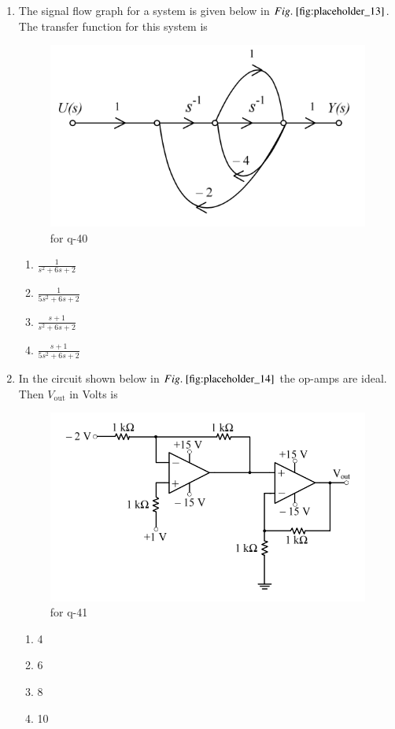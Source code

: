 \documentclass[journal,12pt,onecolumn]{IEEEtran}
\theoremstyle{remark}
\begin{document}
\begin{enumerate}
\item The signal flow graph for a system is given below in $\figref{fig:placeholder_13}$. The transfer function  for this system is
\begin{figure}[H]
    \centering
    \includegraphics[width=0.5\columnwidth]{figs/fig_13.png}
    \caption{for q-40}
    \label{fig:placeholder_13}
\end{figure}

\begin{multicols}{2}

\begin{enumerate}
\item $\frac{1}{s^2 + 6s + 2}$
\item  $\frac{1}{5s^2 + 6s + 2}$ 
\item  $\frac{s + 1}{s^2 + 6s + 2}$
\item  $\frac{s + 1}{5s^2 + 6s + 2}$ 
\end{enumerate}
\end{multicols}
\hfill {}

\item In the circuit shown below in $\figref{fig:placeholder_14}$ the op-amps are ideal. Then $V_{\text{out}}$ in Volts is
\begin{figure}[H]
    \centering
    \includegraphics[width=0.5\columnwidth]{figs/fig_14.png}
    \caption{for q-41}
    \label{fig:placeholder_14}
\end{figure}
\begin{multicols}{4}
\begin{enumerate}
\item 4
\item 6
\item 8
\item 10
\end{enumerate}
\end{multicols}
\hfill {}


\end{enumerate}
\end{document}
